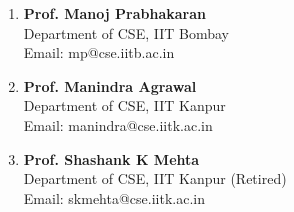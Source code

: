 \documentclass[margin]{res} %
\begin{document}
\begin{resume}
\begin{enumerate}
    \item \textbf{Prof. Manoj Prabhakaran}\\
    Department of CSE, IIT Bombay\\
    Email: mp@cse.iitb.ac.in

    \item \textbf{Prof. Manindra Agrawal}\\
    Department of CSE, IIT Kanpur\\
    Email: manindra@cse.iitk.ac.in



    \item \textbf{Prof. Shashank K Mehta}\\
    Department of CSE, IIT Kanpur (Retired)\\
    Email: skmehta@cse.iitk.ac.in
\end{enumerate}

\end{resume}
\end{document}

